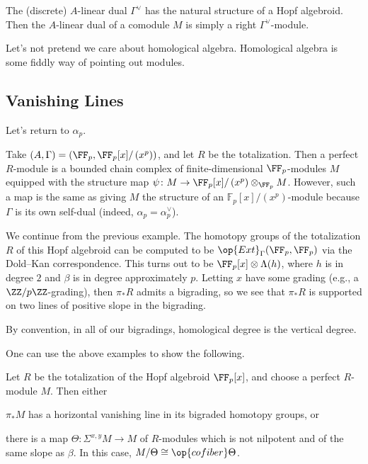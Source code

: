 \documentclass[../notes.tex]{subfiles}
\begin{document}
\begin{remark}
	The (discrete) $A$-linear dual $\Gamma^\lor$ has the natural structure of a Hopf algebroid. Then the $A$-linear dual of a comodule $M$ is simply a right $\Gamma^\lor$-module.
\end{remark}
\begin{remark}[Hahn]
	Let's not pretend we care about homological algebra. Homological algebra is some fiddly way of pointing out modules.
\end{remark}

\subsection{Vanishing Lines}
Let's return to $\alpha_p$.
\begin{example}
	Take $(A,\Gamma)=(\FF_p,\FF_p[x]/\left(x^p\right))$, and let $R$ be the totalization. Then a perfect $R$-module is a bounded chain complex of finite-dimensional $\FF_p$-modules $M$ equipped with the structure map $\psi\colon M\to\FF_p[x]/\left(x^p\right)\otimes_{\FF_p}M$. However, such a map is the same as giving $M$ the structure of an $\mathbb F_p[x]/\left(x^p\right)$-module because $\Gamma$ is its own self-dual (indeed, $\alpha_p=\alpha_p^\lor$).
\end{example}
\begin{example}
	We continue from the previous example. The homotopy groups of the totalization $R$ of this Hopf algebroid can be computed to be $\op{Ext}_\Gamma(\FF_p,\FF_p)$ via the Dold--Kan correspondence. This turns out to be $\FF_p[x]\otimes\Lambda(h)$, where $h$ is in degree $2$ and $\beta$ is in degree approximately $p$. Letting $x$ have some grading (e.g., a $\ZZ/p\ZZ$-grading), then $\pi_*R$ admits a bigrading, so we see that $\pi_*R$ is supported on two lines of positive slope in the bigrading.
\end{example}
\begin{warn}
	By convention, in all of our bigradings, homological degree is the vertical degree.
\end{warn}
One can use the above examples to show the following.
\begin{proposition}
	Let $R$ be the totalization of the Hopf algebroid $\FF_p[x]$, and choose a perfect $R$-module $M$. Then either
	\begin{listalph}
		\item $\pi_*M$ has a horizontal vanishing line in its bigraded homotopy groups, or
		\item there is a map $\Theta\colon\Sigma^{x,y}M\to M$ of $R$-modules which is not nilpotent and of the same slope as $\beta$. In this case, $M/\Theta\cong\op{cofiber}\Theta$. 
	\end{listalph}
\end{proposition}
\end{document}
